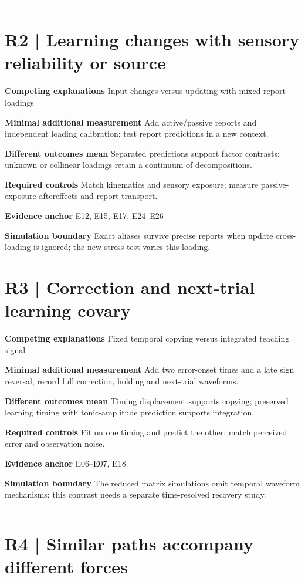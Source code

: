 \documentclass[11pt,a4paper]{article}
\begin{document}
\bigskip\hrule\medskip\section{R2 | Learning changes with sensory reliability or source}
\medskip\textbf{Competing explanations} Input changes versus updating with mixed report loadings\par
\medskip\textbf{Minimal additional measurement} Add active/passive reports and independent loading calibration; test report predictions in a new context.\par
\medskip\textbf{Different outcomes mean} Separated predictions support factor contrasts; unknown or collinear loadings retain a continuum of decompositions.\par
\medskip\textbf{Required controls} Match kinematics and sensory exposure; measure passive-exposure aftereffects and report transport.\par
\medskip\textbf{Evidence anchor} E12, E15, E17, E24--E26\par
\medskip\textbf{Simulation boundary} Exact aliases survive precise reports when update cross-loading is ignored; the new stress test varies this loading.\par
\clearpage\section{R3 | Correction and next-trial learning covary}
\medskip\textbf{Competing explanations} Fixed temporal copying versus integrated teaching signal\par
\medskip\textbf{Minimal additional measurement} Add two error-onset times and a late sign reversal; record full correction, holding and next-trial waveforms.\par
\medskip\textbf{Different outcomes mean} Timing displacement supports copying; preserved learning timing with tonic-amplitude prediction supports integration.\par
\medskip\textbf{Required controls} Fit on one timing and predict the other; match perceived error and observation noise.\par
\medskip\textbf{Evidence anchor} E06--E07, E18\par
\medskip\textbf{Simulation boundary} The reduced matrix simulations omit temporal waveform mechanisms; this contrast needs a separate time-resolved recovery study.\par
\bigskip\hrule\medskip\section{R4 | Similar paths accompany different forces}
\end{document}
